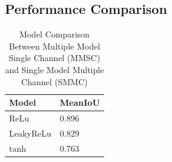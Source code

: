 \documentclass[conference]{IEEEtran}
\begin{document}
\subsection{Performance Comparison}

\begin{table}[h!]
    \centering
    \caption{Model Comparison Between Multiple Model Single Channel (MMSC) and Single Model Multiple Channel (SMMC)}
    \label{tab:model_compare_perf}
    
    \begin{tabularx}{\columnwidth}{|Y|Y|}
        \hline
        \textbf{Model} & \textbf{MeanIoU} \\
        \hline
        ReLu & 0.896  \\
        \hline
        LeakyReLu & 0.829  \\
        \hline
        tanh & 0.763  \\
        \hline
    \end{tabularx}
\end{table}
\end{document}
